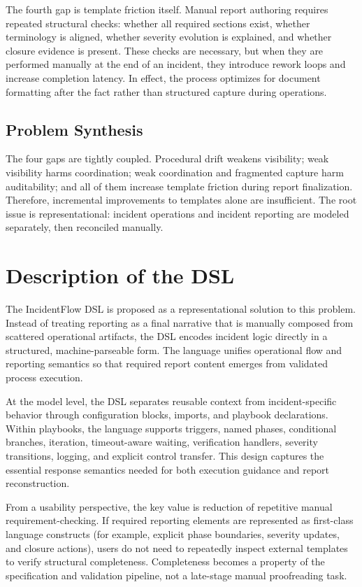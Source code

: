 The fourth gap is template friction itself. Manual report authoring requires repeated structural checks: whether all required sections exist, whether terminology is aligned, whether severity evolution is explained, and whether closure evidence is present. These checks are necessary, but when they are performed manually at the end of an incident, they introduce rework loops and increase completion latency. In effect, the process optimizes for document formatting after the fact rather than structured capture during operations.

\subsection{Problem Synthesis}

The four gaps are tightly coupled. Procedural drift weakens visibility; weak visibility harms coordination; weak coordination and fragmented capture harm auditability; and all of them increase template friction during report finalization. Therefore, incremental improvements to templates alone are insufficient. The root issue is representational: incident operations and incident reporting are modeled separately, then reconciled manually.

\section{Description of the DSL}

The IncidentFlow DSL is proposed as a representational solution to this problem. Instead of treating reporting as a final narrative that is manually composed from scattered operational artifacts, the DSL encodes incident logic directly in a structured, machine-parseable form. The language unifies operational flow and reporting semantics so that required report content emerges from validated process execution.

At the model level, the DSL separates reusable context from incident-specific behavior through configuration blocks, imports, and playbook declarations. Within playbooks, the language supports triggers, named phases, conditional branches, iteration, timeout-aware waiting, verification handlers, severity transitions, logging, and explicit control transfer. This design captures the essential response semantics needed for both execution guidance and report reconstruction.

From a usability perspective, the key value is reduction of repetitive manual requirement-checking. If required reporting elements are represented as first-class language constructs (for example, explicit phase boundaries, severity updates, and closure actions), users do not need to repeatedly inspect external templates to verify structural completeness. Completeness becomes a property of the specification and validation pipeline, not a late-stage manual proofreading task.

